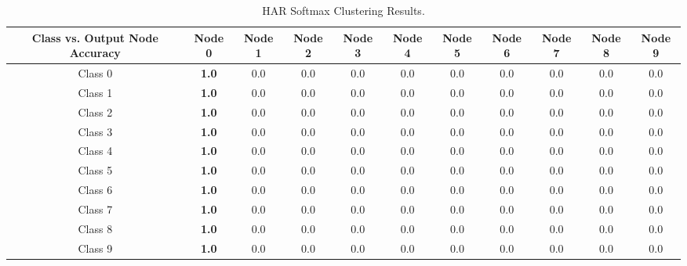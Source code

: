 \documentclass[journal]{IEEEtran}
\begin{document}
    \begin{table}
      \renewcommand{\arraystretch}{1.3}
      \caption{HAR Softmax Clustering Results.}
      \label{tab_har_sfx_all}
      \centering
      \begin{tabular}{|c|c|c|c|c|c|c|c|c|c|c|}
      \hline
      Class vs. Output Node Accuracy & Node 0 & Node 1 & Node 2 & Node 3 & Node 4 & Node 5& Node 6 & Node 7 & Node 8 & Node 9\\
      \hline
      \hline
      Class 0   &  \textbf{1.0}   & 0.0  &  0.0     & 0.0 &  0.0    & 0.0&  0.0    & 0.0  &  0.0    & 0.0\\
      \hline
      Class 1   &  \textbf{1.0}   & 0.0  &  0.0     & 0.0 &  0.0    & 0.0&  0.0    & 0.0  &  0.0    & 0.0\\
      \hline
      Class 2   &  \textbf{1.0}   & 0.0  &  0.0     & 0.0 &  0.0    & 0.0&  0.0    & 0.0  &  0.0    & 0.0\\
      \hline
      Class 3   &  \textbf{1.0}   & 0.0  &  0.0     & 0.0 &  0.0    & 0.0&  0.0    & 0.0  &  0.0    & 0.0\\
      \hline
      Class 4   &  \textbf{1.0}   & 0.0  &  0.0     & 0.0 &  0.0    & 0.0&  0.0    & 0.0  &  0.0    & 0.0\\
      \hline
      Class 5   &  \textbf{1.0}   & 0.0  &  0.0     & 0.0 &  0.0    & 0.0&  0.0    & 0.0  &  0.0    & 0.0\\
      \hline
      Class 6   &  \textbf{1.0}   & 0.0  &  0.0     & 0.0 &  0.0    & 0.0&  0.0    & 0.0  &  0.0    & 0.0\\
      \hline
      Class 7   &  \textbf{1.0}   & 0.0  &  0.0     & 0.0 &  0.0    & 0.0&  0.0    & 0.0  &  0.0    & 0.0\\
      \hline
      Class 8   &  \textbf{1.0}   & 0.0  &  0.0     & 0.0 &  0.0    & 0.0&  0.0    & 0.0  &  0.0    & 0.0\\
      \hline
      Class 9   &  \textbf{1.0}   & 0.0  &  0.0     & 0.0 &  0.0    & 0.0&  0.0    & 0.0  &  0.0    & 0.0\\
      \hline
      \end{tabular}
      \end{table}
% 




\end{document}
